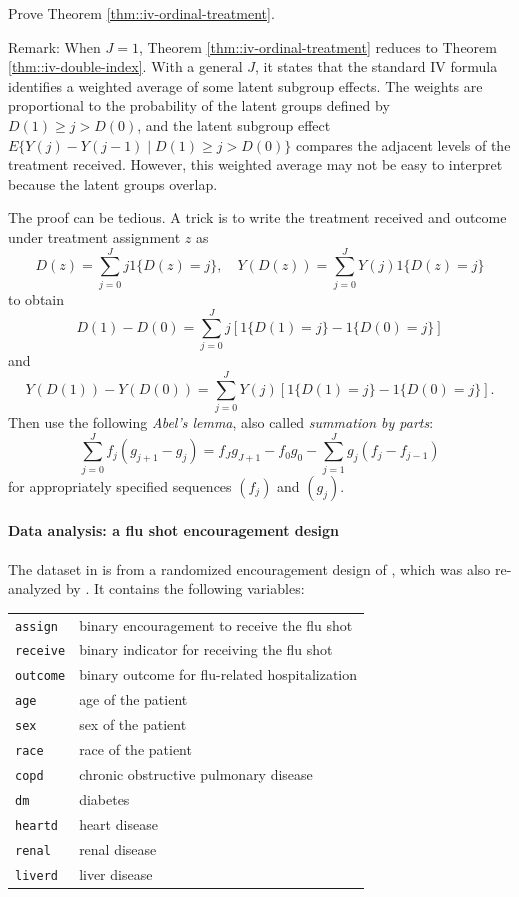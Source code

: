 Prove Theorem \ref{thm::iv-ordinal-treatment}.

Remark: 
When $J=1$, Theorem \ref{thm::iv-ordinal-treatment} reduces to Theorem \ref{thm::iv-double-index}. With a general $J$, it states that the standard IV formula identifies a weighted average of some latent subgroup effects. The weights are proportional to the probability of the latent groups defined by $  D(1) \geq j > D(0) $, and the latent subgroup effect $E\{  Y(j) - Y(j-1)  \mid D(1) \geq j > D(0) \}$ compares the adjacent levels of the treatment received. However, this weighted average may not be easy to interpret because the latent groups overlap.



The proof can be tedious. 
A trick is to write the treatment received and outcome under treatment assignment $z$ as 
$$
D(z) = \sum_{j=0}^J j 1\{ D(z) = j\} ,\quad 
Y(D(z)) = \sum_{j=0}^J  Y(j)1\{ D(z) = j\} 
$$
to obtain
$$
D(1) - D(0) = \sum_{j=0}^J j [ 1\{ D(1) = j\} -1\{ D(0) = j\} ]
$$
and
$$
 Y(D(1))  - Y(D(0))   = 
\sum_{j=0}^J Y(j)   [ 1\{ D(1) = j \}   - 1\{ D(0) = j \}  ].
$$
Then use the following {\it Abel's lemma}, also called {\it summation by parts}: 
$$
\sum_{j=0}^J  f_j (g_{j+1} - g_j) 
= 
f_J g_{J+1} - f_0 g_0  - \sum_{j=1}^J g_j  (f_j - f_{j-1})
$$
for appropriately specified sequences $(f_j)$ and $(g_j)$. 





 
 


\paragraph{Data analysis: a flu shot encouragement design \citep{mcdonald1992effects}}\label{problem::flushot}
 

The dataset in  is from a randomized encouragement design of \citet{mcdonald1992effects}, which was also re-analyzed by \citet{hirano2000assessing}. It contains the following variables:

\begin{tabular}{ll}
\hline 
\texttt{assign} & binary encouragement to receive the flu shot\\
\texttt{receive} & binary indicator for receiving the flu shot \\
\texttt{outcome} & binary outcome for flu-related hospitalization\\
\texttt{age} & age of the patient\\
\texttt{sex} & sex of the patient\\
\texttt{race} & race of the patient\\
\texttt{copd} &  chronic obstructive pulmonary disease\\
\texttt{dm} & diabetes\\
\texttt{heartd} & heart  disease\\
\texttt{renal} & renal  disease\\
\texttt{liverd} & liver  disease\\
\hline 
\end{tabular}


